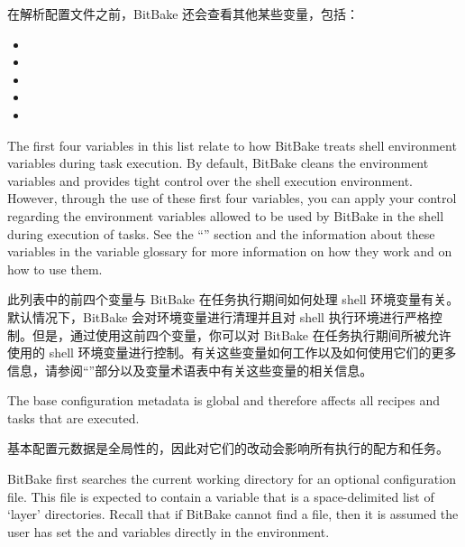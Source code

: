 在解析配置文件之前，BitBake 还会查看其他某些变量，包括：

\begin{itemize}
\setlength\itemsep{1.0em}
\item {}

\item {}

\item {}

\item {}

\item {}
\end{itemize}

The first four variables in this list relate to how BitBake treats shell environment variables during task execution. By default, BitBake cleans the environment variables and provides tight control over the shell execution environment. However, through the use of these first four variables, you can apply your control regarding the environment variables allowed to be used by BitBake in the shell during execution of tasks. See the ``'' section and the information about these variables in the variable glossary for more information on how they work and on how to use them.

此列表中的前四个变量与 BitBake 在任务执行期间如何处理 shell 环境变量有关。默认情况下，BitBake 会对环境变量进行清理并且对 shell 执行环境进行严格控制。但是，通过使用这前四个变量，你可以对 BitBake 在任务执行期间所被允许使用的 shell 环境变量进行控制。有关这些变量如何工作以及如何使用它们的更多信息，请参阅``''部分以及变量术语表中有关这些变量的相关信息。

The base configuration metadata is global and therefore affects all recipes and tasks that are executed.

基本配置元数据是全局性的，因此对它们的改动会影响所有执行的配方和任务。

BitBake first searches the current working directory for an optional  configuration file. This file is expected to contain a  variable that is a space-delimited list of `layer' directories. Recall that if BitBake cannot find a  file, then it is assumed the user has set the  and  variables directly in the environment.

